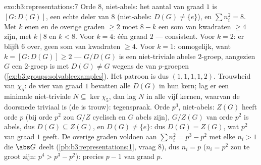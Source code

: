 \begin{solution}{exo:b3:representations:7}
Orde $8$, niet-abels: het aantal  van graad $1$ is $[G :
D(G)]$, een echte deler van $8$ (niet-abels: $D(G) \neq \{e\}$),
en $\sum n_i^2 = 8$. Met $k$ enen en de overige graden $\geq 2$
moet $8 - k$ een som van kwadraten $\geq 4$ zijn, met $k \mid 8$
en $k < 8$. Voor $k = 4$: één graad $2$ --- consistent. Voor $k =
2$: er blijft $6$ over, geen som van kwadraten $\geq 4$. Voor $k =
1$: onmogelijk, want $k = [G : D(G)] \geq 2$ --- $G/D(G)$ is een
niet-triviale abelse $2$-groep, aangezien $G$ een $2$-groep is met
$D(G) \neq G$ wegens de  van $p$-groepen
(\cref{ex:b3:groups:solvableexamples}). Het patroon is dus
$(1,1,1,1,2)$. Trouwheid van $\chi_5$: de vier  van graad
$1$ bevatten alle $D(G)$ in hun kern; lag er een minimale
niet-triviale  $N \subseteq \ker\chi_5$, dan lag $N$
in alle vijf kernen, waarvan de doorsnede triviaal is (de
 is trouw): tegenspraak. Orde $p^3$,
niet-abels: $Z(G)$ heeft orde $p$ (bij orde $p^2$ zou $G/Z$
cyclisch en $G$ abels zijn), $G/Z(G)$ van orde $p^2$ is abels, dus
$D(G) \subseteq Z(G)$, en $D(G) \ne \{e\}$: dus $D(G) = Z(G)$, wat
$p^2$  van graad $1$ geeft. De overige graden voldoen aan
$\sum n_i^2 = p^3 - p^2$ met elke $n_i > 1$ die $\abs G$ deelt
(\cref{pb:b3:representations:1}, vraag 8), dus $n_i = p$ ($n_i =
p^2$ zou te groot zijn: $p^4 > p^3 - p^2$): precies $p - 1$
 van graad $p$.
\end{solution}

